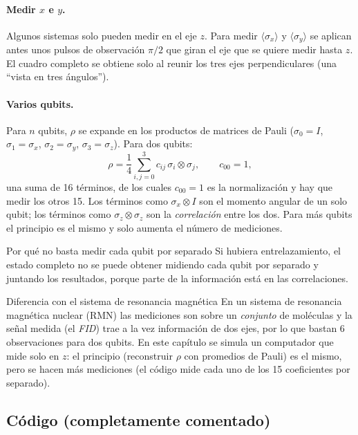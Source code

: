 \paragraph{Medir $x$ e $y$.} Algunos sistemas solo pueden medir en el eje $z$.
Para medir $\langle\sigma_x\rangle$ y $\langle\sigma_y\rangle$ se aplican antes
unos pulsos de observación $\pi/2$ que giran el eje que se quiere medir hasta
$z$. El cuadro completo se obtiene solo al reunir los tres ejes
perpendiculares (una ``vista en tres ángulos'').

\paragraph{Varios qubits.} Para $n$ qubits, $\rho$ se expande en los productos
de matrices de Pauli ($\sigma_0=I$, $\sigma_1=\sigma_x$, $\sigma_2=\sigma_y$,
$\sigma_3=\sigma_z$). Para dos qubits:
\begin{equation}
  \rho=\frac14\sum_{i,j=0}^{3}c_{ij}\,\sigma_i\otimes\sigma_j,\qquad c_{00}=1 ,
\end{equation}
una suma de 16 términos, de los cuales $c_{00}=1$ es la normalización y hay
que medir los otros 15. Los términos como $\sigma_x\otimes I$ son el momento
angular de un solo qubit; los términos como $\sigma_z\otimes\sigma_z$ son la
\emph{correlación} entre los dos. Para más qubits el principio es el mismo y solo
aumenta el número de mediciones.

\begin{nota}{Por qué no basta medir cada qubit por separado}
Si hubiera entrelazamiento, el estado completo no se puede obtener midiendo
cada qubit por separado y juntando los resultados, porque parte de la información
está en las correlaciones.
\end{nota}

\begin{nota}{Diferencia con el sistema de resonancia magnética}
En un sistema de resonancia magnética nuclear (RMN) las mediciones son sobre un
\emph{conjunto} de moléculas y la señal medida (el \emph{FID}) trae a la vez
información de dos ejes, por lo que bastan 6 observaciones para dos qubits. En
este capítulo se simula un computador que mide solo en $z$: el principio
(reconstruir $\rho$ con promedios de Pauli) es el mismo, pero se hacen más
mediciones (el código mide cada uno de los 15 coeficientes por separado).
\end{nota}

\subsection{Código (completamente comentado)}


